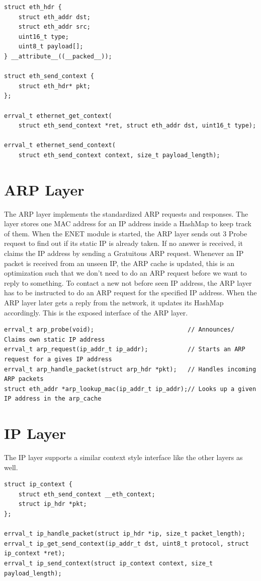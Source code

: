 \begin{verbatim}
struct eth_hdr {
    struct eth_addr dst;
    struct eth_addr src;
    uint16_t type;
    uint8_t payload[];
} __attribute__((__packed__));

struct eth_send_context {
    struct eth_hdr* pkt;
};

errval_t ethernet_get_context(
    struct eth_send_context *ret, struct eth_addr dst, uint16_t type);
    
errval_t ethernet_send_context(
    struct eth_send_context context, size_t payload_length);
\end{verbatim}


\section{ARP Layer}

The ARP layer implements the standardized ARP requests and responses. 
The layer stores one MAC address for an IP address inside a HashMap to keep track of them. When the ENET module is started, the ARP layer sends out 3 Probe request to find out if its static IP is already taken. If no answer is received, it claims the IP address by sending a Gratuitous ARP request. Whenever an IP packet is received from an unseen IP, the ARP cache is updated, this is an optimization such that we don't need to do an ARP request before we want to reply to something. To contact a new not before seen IP address, the ARP layer has to be instructed to do an ARP request for the specified IP address. When the ARP layer later gets a reply from the network, it updates its HashMap accordingly. This is the exposed interface of the ARP layer.
\begin{verbatim}
errval_t arp_probe(void);                          // Announces/ Claims own static IP address 
errval_t arp_request(ip_addr_t ip_addr);           // Starts an ARP request for a gives IP address
errval_t arp_handle_packet(struct arp_hdr *pkt);   // Handles incoming ARP packets
struct eth_addr *arp_lookup_mac(ip_addr_t ip_addr);// Looks up a given IP address in the arp_cache
\end{verbatim}


\section{IP Layer}
The IP layer supports a similar context style interface like the other layers as well.
\begin{verbatim}
struct ip_context {
    struct eth_send_context __eth_context;
    struct ip_hdr *pkt;
};

errval_t ip_handle_packet(struct ip_hdr *ip, size_t packet_length);
errval_t ip_get_send_context(ip_addr_t dst, uint8_t protocol, struct ip_context *ret);
errval_t ip_send_context(struct ip_context context, size_t payload_length);
\end{verbatim}

